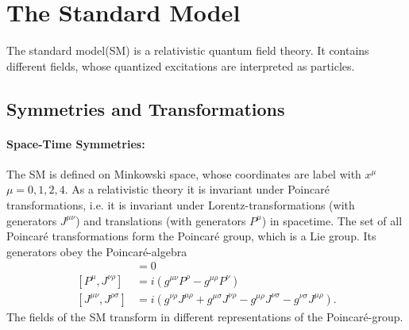 \section{The Standard Model}
The standard model(SM) is a relativistic quantum field theory. 
It contains different fields, whose quantized excitations are interpreted as particles.\\


\subsection{Symmetries and Transformations}
\paragraph{Space-Time Symmetries:}
The SM is defined on Minkowski space, whose coordinates are label with $x^\mu$ $\mu = 0,1,2,4$. As a relativistic theory it is invariant under Poincaré transformations, i.e. it is invariant under Lorentz-transformations (with generators $J^{\mu\nu}$) and translations (with generators $P^\mu$) in spacetime. The set of all Poincaré transformations form the Poincaré group, which is a Lie group. Its generators obey the Poincaré-algebra
\begin{align}
[P^\mu,P^\nu] &= 0\nonumber\\
[P^\mu,J^{\nu\rho}] &= i(g^{\mu\nu} P^\rho - g^{\mu\rho}P^\nu)\nonumber\\
[J^{\mu\nu},J^{\rho\sigma}] &= i(g^{\nu\rho}J^{\mu\rho} + g^{\mu\sigma}J^{\nu\rho} - g^{\mu\rho}J^{\nu\sigma} - g^{\nu\sigma}J^{\mu\rho}).
\end{align}
The fields of the SM transform in different representations of the Poincaré-group.

